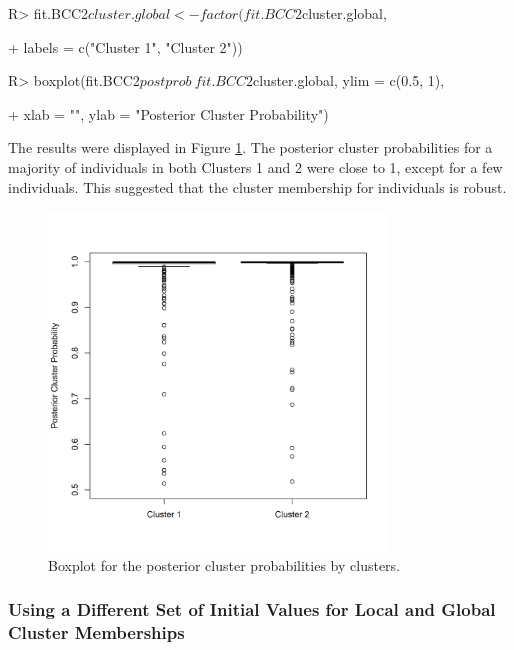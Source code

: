 \begin{example}

R> fit.BCC2$cluster.global <- factor(fit.BCC2$cluster.global,

+        labels = c("Cluster 1", "Cluster 2"))

R> boxplot(fit.BCC2$postprob ~ fit.BCC2$cluster.global, ylim = c(0.5, 1),

+        xlab = "", ylab = "Posterior Cluster Probability")

\end{example} 

The results were displayed in Figure \ref{fig:posterior_prob}. The posterior cluster probabilities for a majority of individuals in both Clusters 1 and 2 were close to 1, except for a few individuals. This suggested that the cluster membership for individuals is robust. 

\begin{figure}[t!]
\centering
\includegraphics[width=9cm,height=9cm]{./Figures/posterior_prob.JPEG}
\caption{\label{fig:posterior_prob}  Boxplot for the posterior cluster probabilities by clusters.}
\end{figure}

\subsubsection{Using a Different Set of Initial Values for Local and Global Cluster Memberships}

